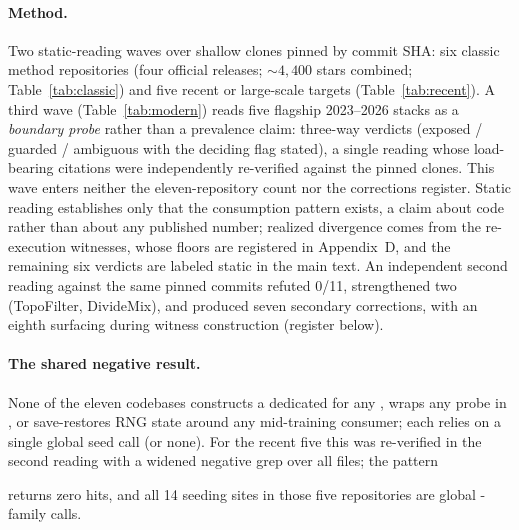 \paragraph{Method.}
Two static-reading waves over shallow clones pinned by commit SHA: six classic
method repositories (four official releases; ${\sim}4{,}400$ stars combined;
Table~\ref{tab:classic}) and five recent or large-scale targets
(Table~\ref{tab:recent}). A third wave (Table~\ref{tab:modern}) reads five
flagship 2023--2026 stacks as a \emph{boundary probe} rather than a prevalence
claim: three-way verdicts (exposed / guarded / ambiguous with the deciding flag
stated), a single reading whose load-bearing citations were independently
re-verified against the pinned clones. This wave enters neither the
eleven-repository count nor the corrections register. Static reading establishes only that the
consumption pattern exists, a claim about code rather than about any published
number; realized divergence comes from the re-execution witnesses, whose floors
are registered in Appendix~D, and the remaining six verdicts are labeled static
in the main text. An independent second reading against the same pinned commits
refuted 0/11, strengthened two (TopoFilter, DivideMix), and produced seven
secondary corrections, with an eighth surfacing during witness construction
(register below).

\paragraph{The shared negative result.}
None of the eleven codebases constructs a dedicated 
for any , wraps any probe in , or
save-restores RNG state around any mid-training consumer; each relies on a
single global seed call (or none). For the recent five this was re-verified
in the second reading with a widened negative grep over all 
files; the pattern
\begin{center}
\end{center}
returns zero hits, and all 14 seeding sites in those five repositories
are global -family calls.

